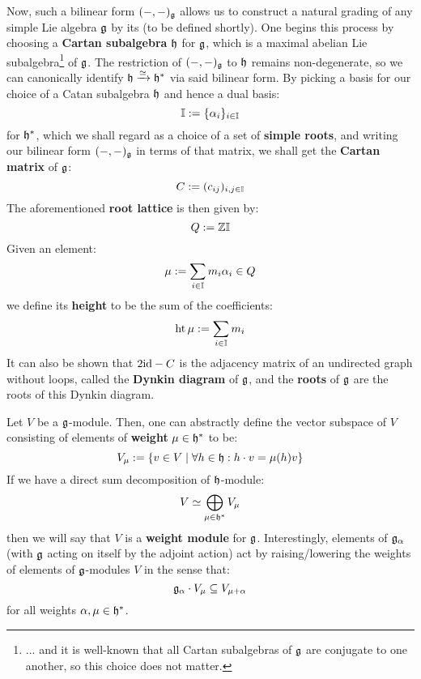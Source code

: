         Now, such a bilinear form $(-, -)_{\mathfrak{g}}$ allows us to construct a natural grading of any simple Lie algebra $\mathfrak{g}$ by its  (to be defined shortly). One begins this process by choosing a \textbf{Cartan subalgebra} $\mathfrak{h}$ for $\mathfrak{g}$, which is a maximal abelian Lie subalgebra\footnote{... and it is well-known that all Cartan subalgebras of $\mathfrak{g}$ are conjugate to one another, so this choice does not matter.} of $\mathfrak{g}$. The restriction of $(-, -)_{\mathfrak{g}}$ to $\mathfrak{h}$ remains non-degenerate, so we can canonically identify $\mathfrak{h} \xrightarrow[]{\simeq} \mathfrak{h}^*$ via said bilinear form. By picking a basis for our choice of a Catan subalgebra $\mathfrak{h}$ and hence a dual basis:
            $$\mathbb{I} := \{\alpha_i\}_{i \in \mathbb{I}}$$
        for $\mathfrak{h}^*$, which we shall regard as a choice of a set of \textbf{simple roots}, and writing our bilinear form $(-, -)_{\mathfrak{g}}$ in terms of that matrix, we shall get the \textbf{Cartan matrix} of $\mathfrak{g}$:
            $$C := (c_{ij})_{i, j \in \mathbb{I}}$$
        The aforementioned \textbf{root lattice} is then given by:
            $$Q := \mathbb{Z} \mathbb{I}$$
        Given an element:
            $$\mu := \sum_{i \in \mathbb{I}} m_i \alpha_i \in Q$$
        we define its \textbf{height} to be the sum of the coefficients:
            $$\operatorname{ht} \mu := \sum_{i \in \mathbb{I}} m_i$$
        It can also be shown that $2\mathrm{id} - C$ is the adjacency matrix of an undirected graph without loops, called the \textbf{Dynkin diagram} of $\mathfrak{g}$, and the \textbf{roots} of $\mathfrak{g}$ are the roots of this Dynkin diagram.
            
        Let $V$ be a $\mathfrak{g}$-module. Then, one can abstractly define the vector subspace of $V$ consisting of elements of \textbf{weight} $\mu \in \mathfrak{h}^*$ to be:
            $$V_{\mu} := \{v \in V \mid \forall h \in \mathfrak{h}: h \cdot v = \mu(h) v\}$$
        If we have a direct sum decomposition of $\mathfrak{h}$-module:
            $$V \simeq \bigoplus_{\mu \in \mathfrak{h}^*} V_{\mu}$$
        then we will say that $V$ is a \textbf{weight module} for $\mathfrak{g}$. Interestingly, elements of $\mathfrak{g}_{\alpha}$ (with $\mathfrak{g}$ acting on itself by the adjoint action) act by raising/lowering the weights of elements of $\mathfrak{g}$-modules $V$ in the sense that:
            $$\mathfrak{g}_{\alpha} \cdot V_{\mu} \subseteq V_{\mu + \alpha}$$
        for all weights $\alpha, \mu \in \mathfrak{h}^*$. 
        
